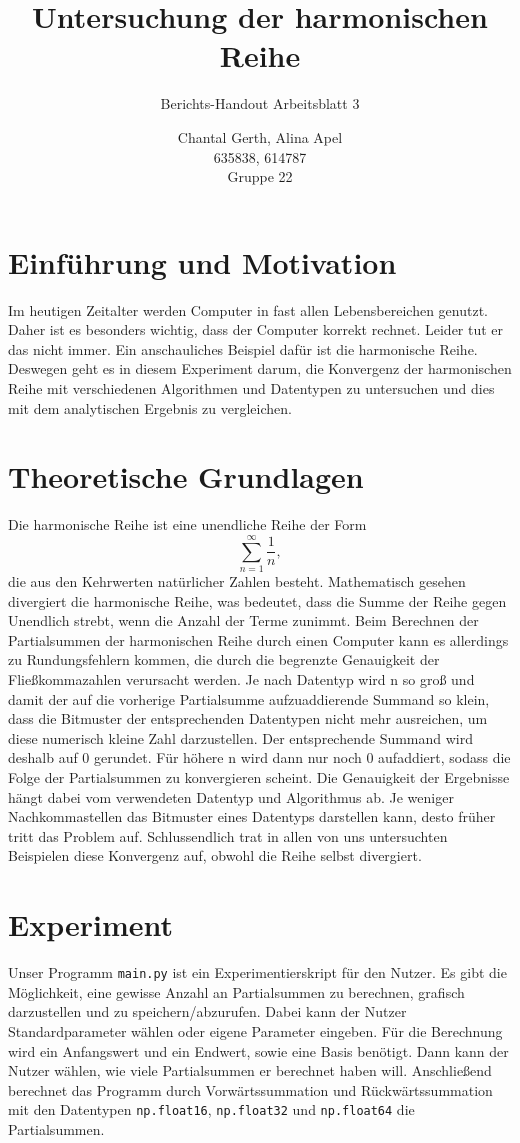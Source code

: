 \documentclass{scrartcl}
\title{Untersuchung der harmonischen Reihe}
\subtitle{Berichts-Handout Arbeitsblatt 3}
\author{Chantal Gerth, Alina Apel\\635838, 614787\\Gruppe 22}
\date{}
\begin{document}
\maketitle
\tableofcontents
\thispagestyle{empty}

\newpage

\section{Einführung und Motivation}
Im heutigen Zeitalter werden Computer in fast allen Lebensbereichen genutzt. Daher ist es besonders wichtig, dass der Computer korrekt rechnet. Leider tut er das nicht immer. Ein anschauliches Beispiel dafür ist die harmonische Reihe. Deswegen geht es in diesem Experiment darum, die Konvergenz der harmonischen Reihe mit verschiedenen Algorithmen und Datentypen zu untersuchen und dies mit dem analytischen Ergebnis zu vergleichen.

\section{Theoretische Grundlagen}
Die harmonische Reihe ist eine unendliche Reihe der Form
\[
\sum_{n=1}^{\infty} \frac{1}{n},
\]
die aus den Kehrwerten natürlicher Zahlen besteht. Mathematisch gesehen divergiert die harmonische Reihe, was bedeutet, dass die Summe der Reihe gegen Unendlich strebt, wenn die Anzahl der Terme zunimmt. Beim Berechnen der Partialsummen der harmonischen Reihe durch einen Computer kann es allerdings zu Rundungsfehlern kommen, die durch die begrenzte Genauigkeit der Fließkommazahlen verursacht werden. Je nach Datentyp wird n so groß und damit der auf die vorherige Partialsumme aufzuaddierende Summand so klein, dass die Bitmuster der entsprechenden Datentypen nicht mehr ausreichen, um diese numerisch kleine Zahl darzustellen. Der entsprechende Summand wird deshalb auf 0 gerundet. Für höhere n wird dann nur noch 0 aufaddiert, sodass die Folge der Partialsummen zu konvergieren scheint. Die Genauigkeit der Ergebnisse hängt dabei vom verwendeten Datentyp und Algorithmus ab. Je weniger Nachkommastellen das Bitmuster eines Datentyps darstellen kann, desto früher tritt das Problem auf. Schlussendlich trat in allen von uns untersuchten Beispielen diese Konvergenz auf, obwohl die Reihe selbst divergiert.

\section{Experiment}
Unser Programm \texttt{main.py} ist ein Experimentierskript für den Nutzer. Es gibt die Möglichkeit, eine gewisse Anzahl an Partialsummen zu berechnen, grafisch darzustellen und zu speichern/abzurufen. Dabei kann der Nutzer Standardparameter wählen oder eigene Parameter eingeben. Für die Berechnung wird ein Anfangswert und ein Endwert, sowie eine Basis benötigt. Dann kann der Nutzer wählen, wie viele Partialsummen er berechnet haben will. Anschließend berechnet das Programm durch Vorwärtssummation und Rückwärtssummation mit den Datentypen \texttt{np.float16}, \texttt{np.float32} und \texttt{np.float64} die Partialsummen.
\end{document}
